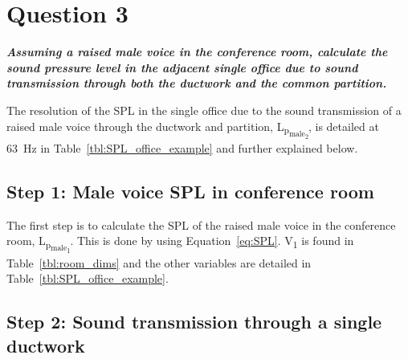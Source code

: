 \section{Question 3}

\textbf{\textit{Assuming a raised male voice in the conference room, calculate the sound pressure level in the adjacent single office due to sound transmission through both the ductwork and the common partition.}}


The resolution of the SPL in the single office due to the sound transmission of a raised male voice through the ductwork and partition, L\textsubscript{p\textsubscript{male\textsubscript{2}}}, is detailed at 63~Hz in Table~\ref{tbl:SPL_office_example} and further explained below.


\subsection{Step 1: Male voice SPL in conference room}

The first step is to calculate the SPL of the raised male voice in the conference room, L\textsubscript{p\textsubscript{male\textsubscript{1}}}.
This is done by using Equation~\ref{eq:SPL}.
V\textsubscript{1} is found in Table~\ref{tbl:room_dims} and the other variables are detailed in Table~\ref{tbl:SPL_office_example}.


\subsection{Step 2: Sound transmission through a single ductwork}

